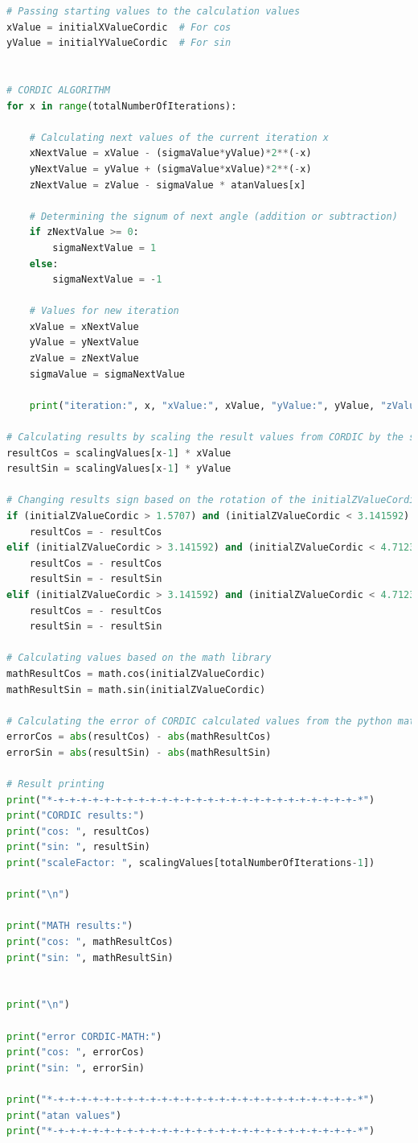 \documentclass[a4paper, twoside, 11pt]{article}
\begin{document}
\begin{lstlisting}[language={python}, caption={Python code of \gls{abbreviation:cordic} implementation.}, label= {lst:python-cordic}]
# Passing starting values to the calculation values
xValue = initialXValueCordic  # For cos
yValue = initialYValueCordic  # For sin


# CORDIC ALGORITHM
for x in range(totalNumberOfIterations):

    # Calculating next values of the current iteration x
    xNextValue = xValue - (sigmaValue*yValue)*2**(-x)
    yNextValue = yValue + (sigmaValue*xValue)*2**(-x)
    zNextValue = zValue - sigmaValue * atanValues[x]

    # Determining the signum of next angle (addition or subtraction)
    if zNextValue >= 0:
        sigmaNextValue = 1
    else:
        sigmaNextValue = -1

    # Values for new iteration
    xValue = xNextValue
    yValue = yNextValue
    zValue = zNextValue
    sigmaValue = sigmaNextValue

    print("iteration:", x, "xValue:", xValue, "yValue:", yValue, "zValue:", zValue, "sigmaValue:", sigmaValue, "\n")

# Calculating results by scaling the result values from CORDIC by the scalingValue which depends on number of iterations which were made
resultCos = scalingValues[x-1] * xValue
resultSin = scalingValues[x-1] * yValue

# Changing results sign based on the rotation of the initialZValueCordic
if (initialZValueCordic > 1.5707) and (initialZValueCordic < 3.141592):
    resultCos = - resultCos
elif (initialZValueCordic > 3.141592) and (initialZValueCordic < 4.7123):
    resultCos = - resultCos
    resultSin = - resultSin
elif (initialZValueCordic > 3.141592) and (initialZValueCordic < 4.7123):
    resultCos = - resultCos
    resultSin = - resultSin

# Calculating values based on the math library
mathResultCos = math.cos(initialZValueCordic)
mathResultSin = math.sin(initialZValueCordic)

# Calculating the error of CORDIC calculated values from the python math functions
errorCos = abs(resultCos) - abs(mathResultCos)
errorSin = abs(resultSin) - abs(mathResultSin)

# Result printing
print("*-+-+-+-+-+-+-+-+-+-+-+-+-+-+-+-+-+-+-+-+-+-+-+-+-+-+-*")
print("CORDIC results:")
print("cos: ", resultCos)
print("sin: ", resultSin)
print("scaleFactor: ", scalingValues[totalNumberOfIterations-1])

print("\n")

print("MATH results:")
print("cos: ", mathResultCos)
print("sin: ", mathResultSin)


print("\n")

print("error CORDIC-MATH:")
print("cos: ", errorCos)
print("sin: ", errorSin)

print("*-+-+-+-+-+-+-+-+-+-+-+-+-+-+-+-+-+-+-+-+-+-+-+-+-+-+-*")
print("atan values")
print("*-+-+-+-+-+-+-+-+-+-+-+-+-+-+-+-+-+-+-+-+-+-+-+-+-+-+-*")
\end{lstlisting}
\end{document}
